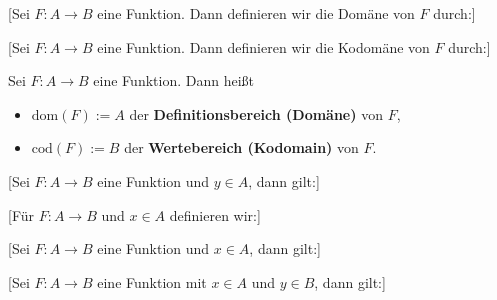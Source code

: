\documentclass[main.tex]{subfiles}
\begin{document}
%
[Sei \(F\colon A\to B\) eine Funktion. Dann definieren wir die Domäne von \(F\) durch:]

%
[Sei \(F\colon A\to B\) eine Funktion. Dann definieren wir die Kodomäne von \(F\) durch:]

\begin{definition}
Sei \(F\colon A\to B\) eine Funktion. Dann heißt
\begin{itemize}
  \item \(\mathrm{dom}(F):=A\) der \textbf{Definitionsbereich (Domäne)} von \(F\),
  \item \(\mathrm{cod}(F):=B\) der \textbf{Wertebereich (Kodomain)} von \(F\).
\end{itemize}
\end{definition}


[Sei \(F\colon A\to B\) eine Funktion und \(y\in A\), dann gilt:]
\begin{tabproof}
\end{tabproof}

[Für \(F\colon A\to B\) und \(x\in A\) definieren wir:]

[Sei \(F\colon A\to B\) eine Funktion und \(x\in A\), dann gilt:]
\begin{tabproof}
\end{tabproof}

[Sei \(F\colon A\to B\) eine Funktion mit \(x\in A\) und \(y\in B\), dann gilt:]
\begin{tabproof}
\end{tabproof}
\end{document}
